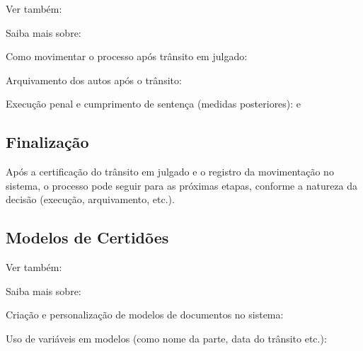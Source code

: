 \documentclass[letterpaper,10pt,brazil]{sphinxmanual}
\begin{document}
\begin{sphinxseealso}{Ver também:}

\sphinxAtStartPar
Saiba mais sobre:

\sphinxAtStartPar
Como movimentar o processo após trânsito em julgado: {\hyperref[\detokenize{projud_40_transitaremjulgado::doc}]{}}

\sphinxAtStartPar
Arquivamento dos autos após o trânsito: {\hyperref[\detokenize{projud_41_arquivamento::doc}]{}}

\sphinxAtStartPar
Execução penal e cumprimento de sentença (medidas posteriores): {\hyperref[\detokenize{projud_53_cadastrodenuncia::doc}]{}} e {\hyperref[\detokenize{projud_54_cadastromedidasalternativas::doc}]{}}


\end{sphinxseealso}



\subsection{Finalização}
\label{\detokenize{09certificartransito:finalizacao}}
\sphinxAtStartPar
Após a certificação do trânsito em julgado e o registro da movimentação no sistema, o processo pode seguir para as próximas etapas, conforme a natureza da decisão (execução, arquivamento, etc.).


\subsection{Modelos de Certidões}
\label{\detokenize{09certificartransito:modelos-de-certidoes}}

\begin{sphinxseealso}{Ver também:}

\sphinxAtStartPar
Saiba mais sobre:

\sphinxAtStartPar
Criação e personalização de modelos de documentos no sistema: {\hyperref[\detokenize{projud_48_criandomodelo::doc}]{}}

\sphinxAtStartPar
Uso de variáveis em modelos (como nome da parte, data do trânsito etc.): {\hyperref[\detokenize{projud_49_variaveis::doc}]{}}


\end{sphinxseealso}
\end{document}
